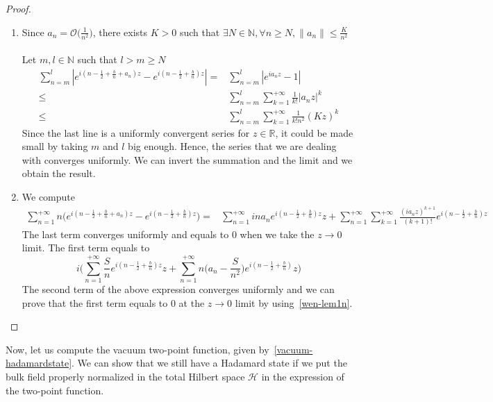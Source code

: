 \begin{proof}
\begin{enumerate}
\item Since $a_n =  \mathcal{O}\big(\frac{1}{n^2}\big)$, 
there exists $ K > 0$ such that $ \exists N \in\mathbb{N}, \forall n\geq N, \| a_n\| \leq \frac{K}{n^2}$ \\\\
Let $m,l\in\mathbb{N}$ such that $l > m \geq N$
\begin{equation*}
\begin{split}
\sum_{n=m}^{l}  | e^{i(n - \frac 1 2+\frac{b}{n}+a_n)z } - e^{i(n-\frac 1 2+\frac{b}{n})z } | = & 
\sum_{n=m}^{l} | e^{ia_n z} - 1 | \\
%
\leq & \sum_{n=m}^{l}\sum_{k=1}^{+\infty}\frac{1}{k!}| a_n z |^k \\
%
\leq & \sum_{n=m}^l \sum_{k=1}^{+\infty}\frac{1}{k!n^2}(Kz)^k
\end{split}
\end{equation*}
Since the last line is a uniformly convergent series for $z \in \mathbb{R}$, it could be made small by taking $m$ and $l$ big enough.
Hence, the series that we are dealing with converges uniformly.
We can invert the summation and the limit and we obtain the result.
%
\item We compute
\begin{equation*}
\begin{split}
\sum_{n=1}^{+\infty} n\big(e^{i(n-\frac 1 2 + \frac b n + a_n)z} - e^{i(n-\frac 1 2 + \frac b n)z}\big) = &
\sum_{n=1}^{+\infty} i n a_n e^{i(n-\frac 1 2 + \frac b n)z}z + \sum_{n=1}^{+\infty}\sum_{k=1}^{+\infty}\frac{(ia_nz)^{k+1}}{(k+1)!}e^{i(n-\frac 1 2 + \frac b n)z}
\end{split}
\end{equation*}
The last term converges uniformly and equals to 0 when we take the $z\rightarrow 0$ limit.
The first term equals to
\begin{equation*}
i\Big(\sum_{n=1}^{+\infty} \frac{S}{n}e^{i(n-\frac 1 2 +\frac b n)z}z 
+ \sum_{n=1}^{+\infty}n\big(a_n - \frac{ S}{ n^2}\big) e^{i(n-\frac 1 2 +\frac b n)}z \Big)
\end{equation*}
The second term of the above expression converges uniformly and we can prove that the first term equals to 0 at the $z\rightarrow 0$ limit by using~\cref{wen-lem1n}.
\end{enumerate}
\end{proof}
Now, let us compute the vacuum two-point function, given by~\cref{vacuum-hadamardstate}.
We can show that we still have a Hadamard state if we put the bulk field properly normalized in the total Hilbert space $\mathcal{H}$ in the expression of the two-point function.\\\\
